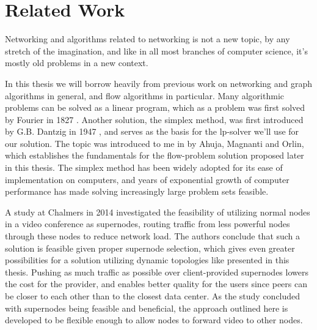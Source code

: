 \section{Related Work}

Networking and algorithms related to networking is not a new topic, by any stretch of the imagination, and like in all most branches of computer science, it's mostly old problems in a new context.

In this thesis we will borrow heavily from previous work on networking and graph algorithms in general, and flow algorithms in particular. Many algorithmic problems can be solved as a linear program, which as a problem was first solved by Fourier in 1827 \cite{sierksma2001linear}. Another solution, the simplex method, was first introduced by G.B. Dantzig in 1947 \cite{sierksma2001linear}, and serves as the basis for the \gls{lp}-solver we'll use for our solution. The topic was introduced to me in \cite{ahuja1988network} by Ahuja, Magnanti and Orlin, which establishes the fundamentals for the flow-problem solution proposed later in this thesis. The simplex method has been widely adopted for its ease of implementation on computers, and years of exponential growth of computer performance has made solving increasingly large problem sets feasible.

A study at Chalmers in 2014 \cite{tree-topology-webrtc} investigated the feasibility of utilizing normal nodes in a video conference as supernodes, routing traffic from less powerful nodes through these nodes to reduce network load. The authors conclude that such a solution is feasible given proper supernode selection, which gives even greater possibilities for a solution utilizing dynamic topologies like presented in this thesis. Pushing as much traffic as possible over client-provided supernodes lowers the cost for the provider, and enables better quality for the users since peers can be closer to each other than to the closest data center. As the study concluded with supernodes being feasible and beneficial, the approach outlined here is developed to be flexible enough to allow nodes to forward video to other nodes.
